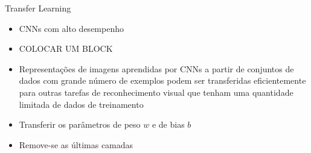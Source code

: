 \begin{frame}{Transfer Learning}
   \ \  \\[0.1cm]
   \begin{itemize}
     \item CNNs com alto desempenho
     \item COLOCAR UM BLOCK
     \item Representações de imagens aprendidas por CNNs a partir de conjuntos de dados com grande número de exemplos podem ser transferidas eficientemente para outras tarefas de reconhecimento visual que tenham uma quantidade limitada de dados de treinamento
     \item Transferir os parâmetros de peso $w$ e de bias $b$
     \item Remove-se as últimas camadas
   \end{itemize}
\end{frame}
